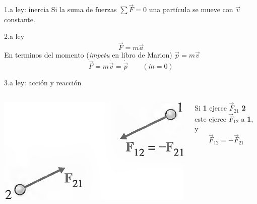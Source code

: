 \documentclass[serif]{beamer}
\begin{document}
\begin{frame}
\begin{block}{1.a ley: inercia}
Si la suma de fuerzas \(\sum \vec{F} = 0\) una partícula se mueve con \(\vec{v}\) constante.
\end{block}
\pause
\begin{block}{2.a ley}
\[
\vec{F}= m \vec{a}
\]
En terminos del momento (\emph{ímpetu} en libro de Marion) \(\vec{p}= m \vec{v}\)
\[
\vec{F} = m \dot{\vec{v}}= \dot{\vec{p}}\qquad (\dot{m}=0 )
\]
\end{block}
\pause
\begin{block}{3.a ley: acción y reacción}
\begin{columns}[c]
	\begin{column}{0.35\textwidth}
		\includegraphics[width=\textwidth]{taylor1_5}
	\end{column}
	\begin{column}{0.65\textwidth}
		Si \textbf{1} ejerce \(\vec{F}_{21}\)  \textbf{2} este ejerce \(\vec{F}_{12}\) a \textbf{1}, y
		\[
			\vec{F}_{12} = - \vec{F}_{21}
		\]
	\end{column}
\end{columns}
\end{block}

\end{frame}
\end{document}
